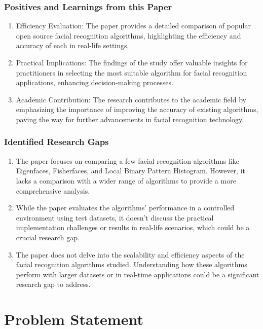 \documentclass[openany]{report}
\begin{document}
\subsection{Positives and Learnings from this Paper}

\begin{enumerate}
    \item Efficiency Evaluation: The paper provides a detailed comparison of popular open source facial recognition algorithms, highlighting the efficiency and accuracy of each in real-life settings.

    \item Practical Implications: The findings of the study offer valuable insights for practitioners in selecting the most suitable algorithm for facial recognition applications, enhancing decision-making processes.

    \item Academic Contribution: The research contributes to the academic field by emphasizing the importance of improving the accuracy of existing algorithms, paving the way for further advancements in facial recognition technology.
\end{enumerate}

\subsection{Identified Research Gaps}
\begin{enumerate}
    \item The paper focuses on comparing a few facial recognition algorithms like Eigenfaces, Fisherfaces, and Local Binary Pattern Histogram. However, it lacks a comparison with a wider range of algorithms to provide a more comprehensive analysis.

    \item While the paper evaluates the algorithms' performance in a controlled environment using test datasets, it doesn't discuss the practical implementation challenges or results in real-life scenarios, which could be a crucial research gap.

    \item The paper does not delve into the scalability and efficiency aspects of the facial recognition algorithms studied. Understanding how these algorithms perform with larger datasets or in real-time applications could be a significant research gap to address.
\end{enumerate}

\chapter{Problem Statement}
\end{document}
